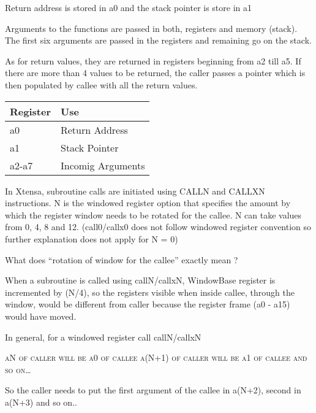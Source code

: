 Return address is stored in a0 and the stack pointer is store in a1

Arguments to the functions are passed in both, registers and memory (stack). The first six arguments are passed in the registers and remaining go on the stack.

As for return values, they are returned in registers beginning from a2 till a5. If there are more than 4 values to be returned, the caller passes a pointer which is then populated by callee with all the return values.


\begin{longtable}{|p{5cm}|p{5cm}|}
	\hline
	Register & Use \\
	\hline
	a0 & Return Address\\ \hline
	a1 & Stack Pointer\\ \hline
	a2-a7 & Incomig Arguments\\ \hline
\end{longtable}

In Xtensa, subroutine calls are initiated using CALLN and CALLXN instructions. N is the windowed register option that specifies the amount by which the register window needs to be rotated for the callee. N can take values from 0, 4, 8 and 12. (call0/callx0 does not follow windowed register convention so further explanation does not apply for N = 0)

What does “rotation of window for the callee” exactly mean ?

When a subroutine is called using callN/callxN, WindowBase register is incremented by (N/4), so the registers visible when inside callee, through the window, would be different from caller because the register frame (a0 - a15) would have moved.

In general, for a windowed register call callN/callxN


\begin{tcolorbox}
	\textsc{aN of caller will be a0 of callee \newline a(N+1) of caller will be a1 of callee and so on…}
\end{tcolorbox}

So the caller needs to put the first argument of the callee in a(N+2), second in a(N+3) and so on..

